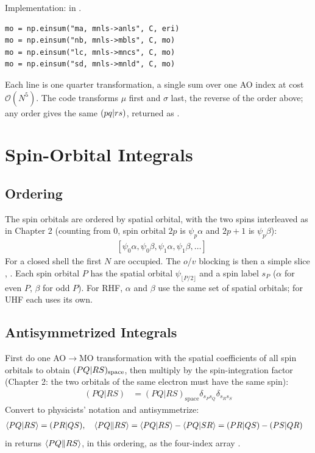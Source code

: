 Implementation:  in .

\begin{codemap}
\begin{lstlisting}[frame=none, numbers=none, xleftmargin=0pt, backgroundcolor={}]
mo = np.einsum("ma, mnls->anls", C, eri)
mo = np.einsum("nb, mnls->mbls", C, mo)
mo = np.einsum("lc, mnls->mncs", C, mo)
mo = np.einsum("sd, mnls->mnld", C, mo)
\end{lstlisting}
Each line is one quarter transformation, a single sum over one AO index at cost $\mathcal{O}(N^5)$. The code transforms $\mu$ first and $\sigma$ last, the reverse of the order above; any order gives the same $(pq\vert rs)$, returned as .
\end{codemap}

\section{Spin-Orbital Integrals}

\subsection{Ordering}

The spin orbitals are ordered by spatial orbital, with the two spins interleaved as in Chapter 2 (counting from 0, spin orbital $2p$ is $\psi_p \alpha$ and $2p + 1$ is $\psi_p \beta$):
\begin{align*}
&[\psi_0 \alpha, \psi_0 \beta, \psi_1 \alpha, \psi_1 \beta, \dots]
\end{align*}
For a closed shell the first $N$ are occupied. The $o$/$v$ blocking is then a simple slice \code{[:N]}, \code{[N:]}. Each spin orbital $P$ has the spatial orbital $\psi_{\lfloor P/2 \rfloor}$ and a spin label $s_P$ ($\alpha$ for even $P$, $\beta$ for odd $P$). For RHF, $\alpha$ and $\beta$ use the same set of spatial orbitals; for UHF each uses its own.

\subsection{Antisymmetrized Integrals}

First do one AO$\to$MO transformation with the spatial coefficients of all spin orbitals to obtain $(PQ\vert RS)_{\text{space}}$, then multiply by the spin-integration factor (Chapter 2: the two orbitals of the same electron must have the same spin):
\begin{align*}
(PQ|RS) &= (PQ|RS)_{\text{space}} \delta_{s_P s_Q} \delta_{s_R s_S}
\end{align*}
Convert to physicists' notation and antisymmetrize:
\begin{align*}
\langle PQ\vert RS\rangle &= (PR|QS), \quad \langle PQ\Vert RS\rangle = \langle PQ\vert RS\rangle - \langle PQ\vert SR\rangle = (PR|QS) - (PS|QR)
\end{align*}
 in  returns $\langle PQ\Vert RS\rangle$, in this ordering, as the four-index array .

